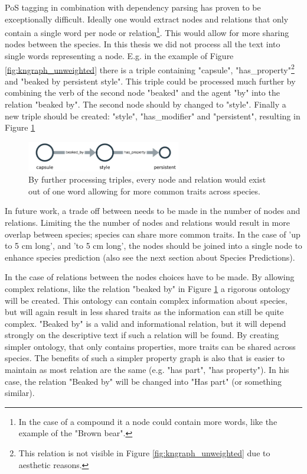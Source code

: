 \documentclass[a4paper, 12pt, oneside]{book} %
\begin{document}
PoS tagging in combination with dependency parsing has proven to be exceptionally difficult.
Ideally one would extract nodes and relations that only contain a single word per node or relation\footnote{In the case of a compound it a node could contain more words, like the example of the "Brown bear".}.
This would allow for more sharing nodes between the species. 
In this thesis we did not process all the text into single words representing a node.
E.g. in the example of Figure \ref{fig:kngraph_unweighted} there is a triple containing "capsule", "has\_property"\footnote{This relation is not visible in Figure \ref{fig:kngraph_unweighted} due to aesthetic reasons.} and "beaked by persistent style".
This triple could be processed much further by combining the verb of the second node "beaked" and the agent "by" into the relation "beaked by".
The second node should by changed to "style".
Finally a new triple should be created: "style", "has\_modifier" and "persistent", resulting in Figure \ref{fig:kn_discussion}
\begin{figure}[htpb]
 \centering
 \includegraphics[width=0.6\textwidth]{figures/kn_discussion_example.pdf}
 \caption[Processing triples into singular words]{By further processing triples, every node and relation would exist out of one word allowing for more common traits across species.}
 \label{fig:kn_discussion}
\end{figure}

In future work, a trade off between needs to be made in the number of nodes and relations.
Limiting the the number of nodes and relations would result in more overlap between species; species can share more common traits.
In the case of 'up to 5 cm long', and 'to 5 cm long', the nodes should be joined into a single node to enhance species prediction (also see the next section about Species Predictions).

In the case of relations between the nodes choices have to be made. 
By allowing complex relations, like the relation "beaked by" in Figure \ref{fig:kn_discussion} a rigorous ontology will be created.
This ontology can contain complex information about species, but will again result in less shared traits as the information can still be quite complex.
"Beaked by" is a valid and informational relation, but it will depend strongly on the descriptive text if such a relation will be found.
By creating simpler ontology, that only contains properties, more traits can be shared across species. 
The benefits of such a simpler property graph is also that is easier to maintain as most relation are the same (e.g. "has part", "has property").
In his case, the relation "Beaked by" will be changed into "Has part" (or something similar).
\end{document}
